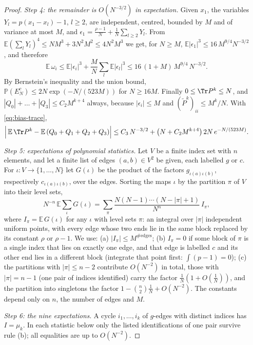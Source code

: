 \begin{proof}
\emph{Step 4: the remainder is $O(N^{-3/2})$ in expectation.} Given $x_1$, the variables $Y_l=p(x_1-x_l)-1$, $l\ge2$, are independent, centred, bounded by $M$ and of variance at most $M$, and $\epsilon_1=\frac{\rho-1}N+\frac1N\sum_{l\ge2}Y_l$. From $\mathbb E(\sum_lY_l)^4\le NM^3+3N^2M^2\le4N^2M^3$ we get, for $N\ge M$, $\mathbb E|\epsilon_1|^3\le16\,M^{9/4}N^{-3/2}$, and therefore
\[
\mathbb E\,\omega_i\le\mathbb E|\epsilon_i|^3+\frac MN\sum_l\mathbb E|\epsilon_l|^3\le16\,(1+M)\,M^{9/4}\,N^{-3/2}.
\]
By Bernstein's inequality and the union bound, $\mathbb P(E_N^c)\le2N\exp(-N/(523M))$ for $N\ge16M$. Finally $0\le\Tr P^k\le N$, and $|Q_0|+\dots+|Q_3|\le C_2M^{k+4}$ always, because $|\epsilon_i|\le M$ and $(\tilde P^k)_{ii}\le M^k/N$. With \eqref{eq:bias-trace},
\begin{equation}\label{eq:bias-reduce}
\Big|\,\mathbb E\,\Tr P^k-\mathbb E\,(Q_0+Q_1+Q_2+Q_3)\Big|\le C_3\,N^{-3/2}+\big(N+C_2M^{k+4}\big)\,2N\,e^{-N/(523M)} .
\end{equation}

\emph{Step 5: expectations of polynomial statistics.} Let $V$ be a finite index set with $n$ elements, and let a finite list of edges $(a,b)\in V^2$ be given, each labelled $g$ or $c$. For $\iota\colon V\to\{1,\dots,N\}$ let $G(\iota)$ be the product of the factors $g_{\iota(a)\iota(b)}$, respectively $c_{\iota(a)\iota(b)}$, over the edges. Sorting the maps $\iota$ by the partition $\pi$ of $V$ into their level sets,
\begin{equation}\label{eq:bias-diagram}
N^{-n}\,\mathbb E\sum_\iota G(\iota)=\sum_\pi\frac{N(N-1)\cdots(N-|\pi|+1)}{N^n}\,I_\pi ,
\end{equation}
where $I_\pi=\mathbb E\,G(\iota)$ for any $\iota$ with level sets $\pi$: an integral over $|\pi|$ independent uniform points, with every edge whose two ends lie in the same block replaced by its constant $\rho$ or $\rho-1$. We use: (a) $|I_\pi|\le M^{\#\mathrm{edges}}$; (b) $I_\pi=0$ if some block of $\pi$ is a single index that lies on exactly one edge, and that edge is labelled $c$ and its other end lies in a different block (integrate that point first: $\int(p-1)=0$); (c) the partitions with $|\pi|\le n-2$ contribute $O(N^{-2})$ in total, those with $|\pi|=n-1$ (one pair of indices identified) carry the factor $\frac1N(1+O(\frac1N))$, and the partition into singletons the factor $1-\binom n2\frac1N+O(N^{-2})$. The constants depend only on $n$, the number of edges and $M$.

\emph{Step 6: the nine expectations.} A cycle $i_1,\dots,i_k$ of $g$-edges with distinct indices has $I=\mu_k$. In each statistic below only the listed identifications of one pair survive rule (b); all equalities are up to $O(N^{-2})$.


\end{proof}
